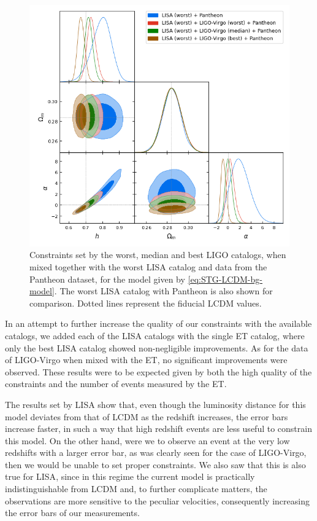 \begin{figure}[h!]
    \centering
    \includegraphics[width=0.65\columnwidth]{figures/fQ-LCDM-bg_LISA-12_LIGO-1,2,13_pantheon-binned.png}
    \caption[Constraints set by the worst, median and best LIGO catalogs, when joined together with the worst LISA catalog and data from the Pantheon dataset, for the most general model of $f(Q)$ with a $\Lambda$CDM backgroun. The worst \gls{LISA} catalog with Pantheon is also shown for comparison.]
    {Constraints set by the worst, median and best \gls{LIGO} catalogs, when mixed together with the worst \gls{LISA} catalog and data from the Pantheon dataset, for the model given by \cref{eq:STG-LCDM-bg-model}. The worst \gls{LISA} catalog with Pantheon is also shown for comparison. Dotted lines represent the fiducial \gls{LCDM} values.}
    \label{fig:FQ_LISA-12_SNIa-binned_none;LIGO-1;2;13}
\end{figure}

In an attempt to further increase the quality of our constraints with the available catalogs, we added each of the \gls{LISA} catalogs with the single \gls{ET} catalog, where only the best \gls{LISA} catalog showed non-negligible improvements. As for the data of \gls{LIGO}-Virgo when mixed with the \gls{ET}, no significant improvements were observed. These results were to be expected given by both the high quality of the constraints and the number of events measured by the \gls{ET}.

The results set by \gls{LISA} show that, even though the luminosity distance for this model deviates from that of \gls{LCDM} as the redshift increases, the error bars increase faster, in such a way that high redshift events are less useful to constrain this model. On the other hand, were we to observe an event at the very low redshifts with a larger error bar, as was clearly seen for the case of \gls{LIGO}-Virgo, then we would be unable to set proper constraints. We also saw that this is also true for \gls{LISA}, since in this regime the current model is practically indistinguishable from \gls{LCDM} and, to further complicate matters, the observations are more sensitive to the peculiar velocities, consequently increasing the error bars of our measurements.

